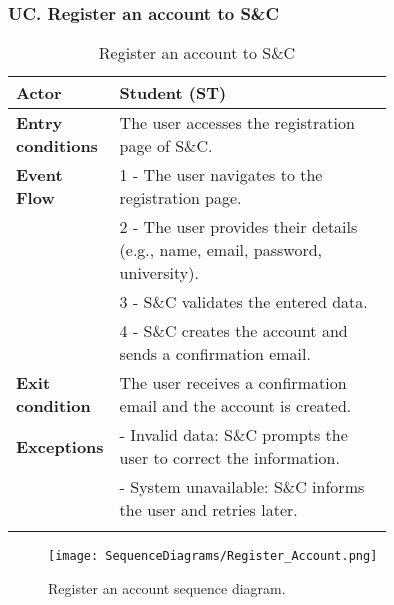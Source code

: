\subsubsection*{UC\cuc . Register an account to S\&C}
\begin{center}
    \begin{longtable}{|l|p{0.75\linewidth}|}
        \hline
        \textbf{Actor}            & Student (ST) \\
        \hline
        \textbf{Entry conditions} & The user accesses the registration page of S\&C. \\
        \hline
        \textbf{Event Flow}       & 1 - The user navigates to the registration page. \\
        & 2 - The user provides their details (e.g., name, email, password, university). \\
        & 3 - S\&C validates the entered data. \\
        & 4 - S\&C creates the account and sends a confirmation email. \\
        \hline
        \textbf{Exit condition}   & The user receives a confirmation email and the account is created. \\       
        \hline
        \textbf{Exceptions}       & - Invalid data: S\&C prompts the user to correct the information. \\
                                  & - System unavailable: S\&C informs the user and retries later. \\
        \hline
        \caption{Register an account to S\&C}
        \label{tab:register_account_usecase}
    \end{longtable}
\end{center}

\begin{figure}[H]
    \begin{center}
        \texttt{[image: SequenceDiagrams/Register\_Account.png]}
        \caption{Register an account sequence diagram.}
        \label{fig:register_account_seqd}%
    \end{center}
\end{figure}

\newpage

